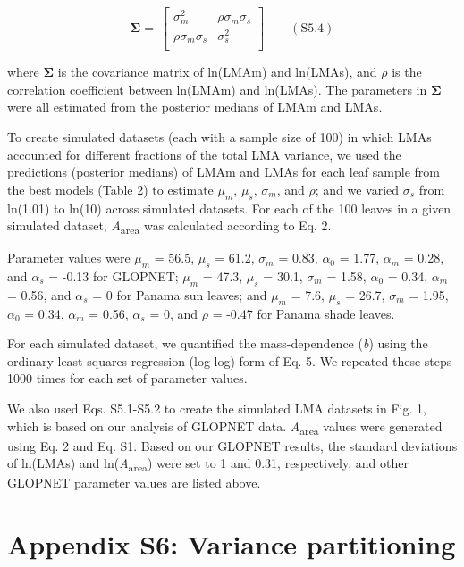 \documentclass[
  12pt,
  letterpaper,
  DIV=11,
  numbers=noendperiod]{scrartcl}
\begin{document}
\[
\boldsymbol{\Sigma} = \
\begin{bmatrix}
\sigma_m^2 & \rho \sigma_m \sigma_s \\
\rho \sigma_m \sigma_s & \sigma_s^2 \\
\end{bmatrix} \qquad(\mathrm{S}5.4)
\]

where \(\boldsymbol{\Sigma}\) is the covariance matrix of ln(LMAm) and
ln(LMAs), and \(\rho\) is the correlation coefficient between ln(LMAm)
and ln(LMAs). The parameters in \(\boldsymbol{\Sigma}\) were all
estimated from the posterior medians of LMAm and LMAs.

To create simulated datasets (each with a sample size of 100) in which
LMAs accounted for different fractions of the total LMA variance, we
used the predictions (posterior medians) of LMAm and LMAs for each leaf
sample from the best models (Table 2) to estimate \(\mu_m\), \(\mu_s\),
\(\sigma_m\), and \(\rho\); and we varied \(\sigma_s\) from ln(1.01) to
ln(10) across simulated datasets. For each of the 100 leaves in a given
simulated dataset, \emph{A}\textsubscript{area} was calculated according
to Eq. 2.

Parameter values were \(\mu_m\) = 56.5, \(\mu_s\) = 61.2, \(\sigma_m\) =
0.83, \(\alpha_0\) = 1.77, \(\alpha_m\) = 0.28, and \(\alpha_s\) = -0.13
for GLOPNET; \(\mu_m\) = 47.3, \(\mu_s\) = 30.1, \(\sigma_m\) = 1.58,
\(\alpha_0\) = 0.34, \(\alpha_m\) = 0.56, and \(\alpha_s\) = 0 for
Panama sun leaves; and \(\mu_m\) = 7.6, \(\mu_s\) = 26.7, \(\sigma_m\) =
1.95, \(\alpha_0\) = 0.34, \(\alpha_m\) = 0.56, \(\alpha_s\) = 0, and
\(\rho\) = -0.47 for Panama shade leaves.

For each simulated dataset, we quantified the mass-dependence (\emph{b})
using the ordinary least squares regression (log-log) form of Eq. 5. We
repeated these steps 1000 times for each set of parameter values.

We also used Eqs. S5.1-S5.2 to create the simulated LMA datasets in Fig.
1, which is based on our analysis of GLOPNET data.
\emph{A}\textsubscript{area} values were generated using Eq. 2 and Eq.
S1. Based on our GLOPNET results, the standard deviations of ln(LMAs)
and ln(\emph{A}\textsubscript{area}) were set to 1 and 0.31,
respectively, and other GLOPNET parameter values are listed above.

\hypertarget{appendix-s6-variance-partitioning}{%
\section{Appendix S6: Variance
partitioning}\label{appendix-s6-variance-partitioning}}
\end{document}
